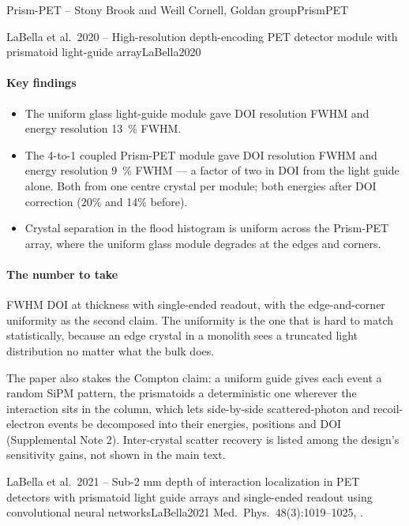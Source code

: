 \begin{programnote}{Prism-PET -- Stony Brook and Weill Cornell, Goldan group}{PrismPET}
\begin{papernote}{LaBella et al.\ 2020 -- High-resolution depth-encoding PET detector module with prismatoid light-guide array}{LaBella2020}
\paragraph{Key findings}
\begin{itemize}
	\item The uniform glass light-guide module gave DOI resolution 
		FWHM and energy resolution \qty{13}{\percent} FWHM.
	\item The 4-to-1 coupled Prism-PET module gave DOI resolution 
		FWHM and energy resolution \qty{9}{\percent} FWHM --- a factor of two in
		DOI from the light guide alone. Both from one centre crystal per
		module; both energies after DOI correction (20\% and 14\% before).
	\item Crystal separation in the flood histogram is uniform across the
		Prism-PET array, where the uniform glass module degrades at the edges
		and corners.
\end{itemize}

\paragraph{The number to take}
 FWHM DOI at  thickness with single-ended readout, with the
edge-and-corner uniformity as the second claim. The uniformity is the one that
is hard to match statistically, because an edge crystal in a monolith sees a
truncated light distribution no matter what the bulk does.

The paper also stakes the Compton claim: a uniform guide gives each event a
random SiPM pattern, the prismatoids a deterministic one wherever the
interaction sits in the column, which lets side-by-side scattered-photon and
recoil-electron events be decomposed into their energies, positions and DOI
(Supplemental Note 2). Inter-crystal scatter recovery is listed among the
design's sensitivity gains, not shown in the main text.

\end{papernote}

\begin{papernote}{LaBella et al.\ 2021 -- Sub-2 mm depth of interaction localization in PET detectors with prismatoid light guide arrays and single-ended readout using convolutional neural networks}{LaBella2021}
Med.\ Phys.\ 48(3):1019--1025, .


\end{papernote}
\end{programnote}
